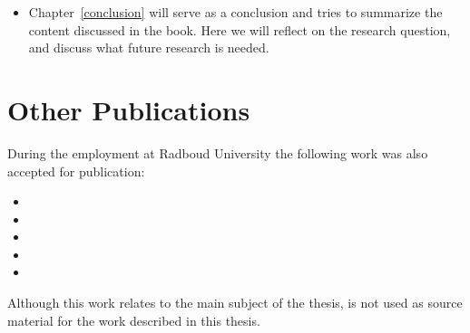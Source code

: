 \begin{itemize}
{
\scriptsize
	\begin{itemize}
		\item {}
	\end{itemize}
}

\item Chapter~\ref{conclusion} will serve as a conclusion and tries to summarize the content discussed in the book. Here we will reflect on the research question, and discuss what future research is needed.
\end{itemize}

\section{Other Publications}
During the employment at Radboud University the following work was also accepted for publication: 

{\scriptsize
\begin{itemize}	
	\item {}
	\item {}	
	\item {}
	\item {}
	\item {}
\end{itemize}
}

Although this work relates to the main subject of the thesis, is not used as source material for the work described in this thesis. 
